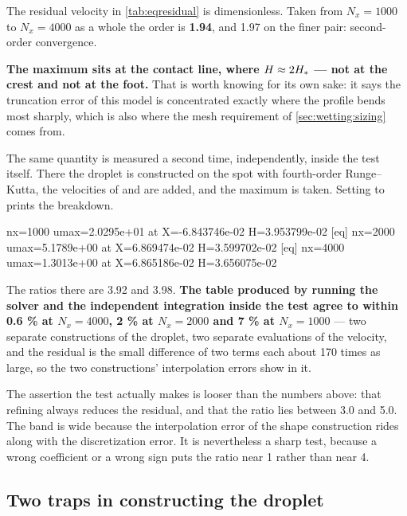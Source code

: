 The residual velocity in \cref{tab:eqresidual} is dimensionless. Taken from
$N_x = 1000$ to $N_x = 4000$ as a whole the order is \textbf{1.94}, and 1.97
on the finer pair: second-order convergence.

\textbf{The maximum sits at the contact line, where $H \approx 2H_{*}$ --- not
at the crest and not at the foot.} That is worth knowing for its own sake: it
says the truncation error of this model is concentrated exactly where the
profile bends most sharply, which is also where the mesh requirement of
\cref{sec:wetting:sizing} comes from.

The same quantity is measured a second time, independently, inside the test
itself. There the droplet is constructed on the spot with fourth-order
Runge--Kutta, the velocities of  and
 are added, and the maximum is
taken. Setting  to  prints the breakdown.

\begin{plain}
  [eq] nx=1000 umax=2.0295e+01  at X=-6.843746e-02 H=3.953799e-02
  [eq] nx=2000 umax=5.1789e+00  at X=6.869474e-02 H=3.599702e-02
  [eq] nx=4000 umax=1.3013e+00  at X=6.865186e-02 H=3.656075e-02
\end{plain}

The ratios there are 3.92 and 3.98. \textbf{The table produced by running the
solver and the independent integration inside the test agree to within
0.6 \% at $N_x = 4000$, 2 \% at $N_x = 2000$ and 7 \% at $N_x = 1000$} ---
two separate constructions of the droplet, two separate evaluations of the
velocity, and the residual is the small difference of two terms each about
170 times as large, so the two constructions' interpolation errors show in
it.

The assertion the test actually makes is looser than the numbers above: that
refining always reduces the residual, and that the ratio lies between 3.0 and
5.0. The band is wide because the interpolation error of the shape construction
rides along with the discretization error. It is nevertheless a sharp test,
because a wrong coefficient or a wrong sign puts the ratio near 1 rather than
near 4.

\subsection{Two traps in constructing the droplet}

